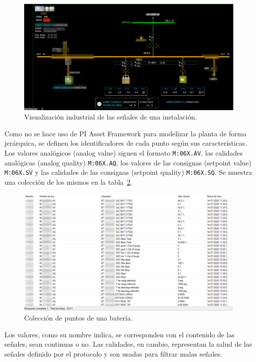 \begin{figure}
  \centering
  \includegraphics[width=0.75\linewidth]{figures/visualizacion-industrial-de-bateria.png}
  \caption[Visualización industrial de señales de instalación.]{Visualización industrial de las señales de una instalación.}%
  \label{fig:visualizacion-industrial-de-bateria}
\end{figure}

Como no se hace uso de PI Asset Framework para modelizar la planta de forma jerárquica, se definen los identificadores de cada punto según sus características. Los valores analógicos (analog value) siguen el formato \texttt{M:06X.AV}, las calidades analógicas (analog quality) \texttt{M:06X.AQ}, los valores de las consignas (setpoint value) \texttt{M:06X.SV} y las calidades de las consignas (setpoint quality) \texttt{M:06X.SQ}. Se muestra una colección de los mismos en la tabla~\ref{fig:puntos-bateria}.

\begin{figure}
  \centering
  \includegraphics[width=0.75\linewidth]{figures/puntos-bateria.png}
  \caption[Colección de puntos de una batería.]{Colección de puntos de una batería.}%
  \label{fig:puntos-bateria}
\end{figure}

Los valores, como su nombre indica, se corresponden con el contenido de las señales, sean continuas o no. Las calidades, en cambio, representan la salud de las señales definido por el protocolo y son usadas para filtrar malas señales.

